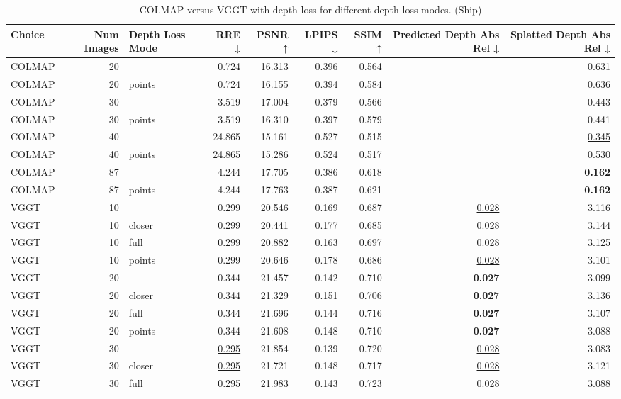 \begin{table}[H]
\caption{COLMAP versus VGGT with depth loss for different depth loss modes. (Ship)}
\label{tab:05_depth_loss_num_images_ship}
\begin{tabular}{lrlrrrrrr}
\toprule
Choice & Num Images & Depth Loss Mode & RRE ↓ & PSNR ↑ & LPIPS ↓ & SSIM ↑ & Predicted Depth Abs Rel ↓ & Splatted Depth Abs Rel ↓ \\
\midrule
COLMAP & 20 &  & 0.724 & 16.313 & 0.396 & 0.564 &  & 0.631 \\
COLMAP & 20 & points & 0.724 & 16.155 & 0.394 & 0.584 &  & 0.636 \\
COLMAP & 30 &  & 3.519 & 17.004 & 0.379 & 0.566 &  & 0.443 \\
COLMAP & 30 & points & 3.519 & 16.310 & 0.397 & 0.579 &  & 0.441 \\
COLMAP & 40 &  & 24.865 & 15.161 & 0.527 & 0.515 &  & \underline{0.345} \\
COLMAP & 40 & points & 24.865 & 15.286 & 0.524 & 0.517 &  & 0.530 \\
COLMAP & 87 &  & 4.244 & 17.705 & 0.386 & 0.618 &  & \textbf{0.162} \\
COLMAP & 87 & points & 4.244 & 17.763 & 0.387 & 0.621 &  & \textbf{0.162} \\
VGGT & 10 &  & 0.299 & 20.546 & 0.169 & 0.687 & \underline{0.028} & 3.116 \\
VGGT & 10 & closer & 0.299 & 20.441 & 0.177 & 0.685 & \underline{0.028} & 3.144 \\
VGGT & 10 & full & 0.299 & 20.882 & 0.163 & 0.697 & \underline{0.028} & 3.125 \\
VGGT & 10 & points & 0.299 & 20.646 & 0.178 & 0.686 & \underline{0.028} & 3.101 \\
VGGT & 20 &  & 0.344 & 21.457 & 0.142 & 0.710 & \textbf{0.027} & 3.099 \\
VGGT & 20 & closer & 0.344 & 21.329 & 0.151 & 0.706 & \textbf{0.027} & 3.136 \\
VGGT & 20 & full & 0.344 & 21.696 & 0.144 & 0.716 & \textbf{0.027} & 3.107 \\
VGGT & 20 & points & 0.344 & 21.608 & 0.148 & 0.710 & \textbf{0.027} & 3.088 \\
VGGT & 30 &  & \underline{0.295} & 21.854 & 0.139 & 0.720 & \underline{0.028} & 3.083 \\
VGGT & 30 & closer & \underline{0.295} & 21.721 & 0.148 & 0.717 & \underline{0.028} & 3.121 \\
VGGT & 30 & full & \underline{0.295} & 21.983 & 0.143 & 0.723 & \underline{0.028} & 3.088 \\

\end{tabular}
\end{table}
